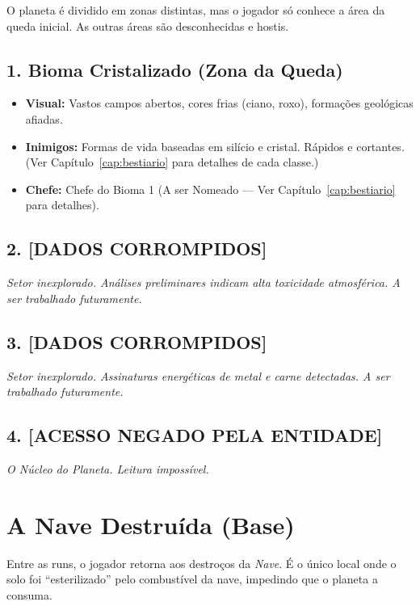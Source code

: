 \documentclass[a4paper,12pt]{report}
\begin{document}
O planeta é dividido em zonas distintas, mas o jogador só conhece a área da queda inicial. As outras áreas são desconhecidas e hostis.

\section{1. Bioma Cristalizado (Zona da Queda)}
\begin{itemize}
    \item \textbf{Visual:} Vastos campos abertos, cores frias (ciano, roxo), formações geológicas afiadas.
    \item \textbf{Inimigos:} Formas de vida baseadas em silício e cristal. Rápidos e cortantes. (Ver Capítulo~\ref{cap:bestiario} para detalhes de cada classe.)
    \item \textbf{Chefe:} Chefe do Bioma 1 (A ser Nomeado --- Ver Capítulo~\ref{cap:bestiario} para detalhes).
\end{itemize}

\section{2. [DADOS CORROMPIDOS]}
\textit{Setor inexplorado. Análises preliminares indicam alta toxicidade atmosférica. A ser trabalhado futuramente.}

\section{3. [DADOS CORROMPIDOS]}
\textit{Setor inexplorado. Assinaturas energéticas de metal e carne detectadas. A ser trabalhado futuramente.}

\section{4. [ACESSO NEGADO PELA ENTIDADE]}
\textit{O Núcleo do Planeta. Leitura impossível.}

\chapter{A Nave Destruída (Base)}

Entre as runs, o jogador retorna aos destroços da \textit{Nave}. É o único local onde o solo foi ``esterilizado'' pelo combustível da nave, impedindo que o planeta a consuma.
\end{document}
